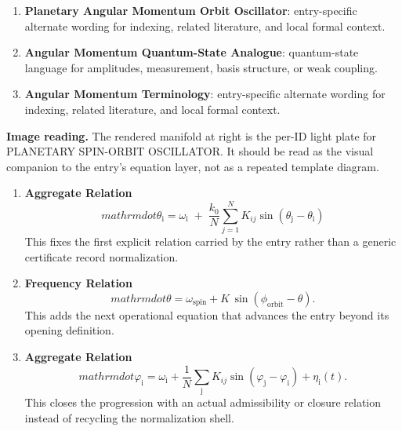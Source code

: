 \begin{enumerate}[leftmargin=1.6em,itemsep=6pt,topsep=4pt]
\item \textbf{Planetary Angular Momentum Orbit Oscillator}: entry-specific alternate wording for indexing, related literature, and local formal context.
\item \textbf{Angular Momentum Quantum-State Analogue}: quantum-state language for amplitudes, measurement, basis structure, or weak coupling.
\item \textbf{Angular Momentum Terminology}: entry-specific alternate wording for indexing, related literature, and local formal context.
\end{enumerate}

\begin{samepage}
\noindent\begin{minipage}[t]{0.45\linewidth}
\vspace{0pt}
\raggedright
\scriptsize\textbf{Image reading.} The rendered manifold at right is the per-ID light plate for PLANETARY SPIN-ORBIT OSCILLATOR. It should be read as the visual companion to the entry's equation layer, not as a repeated template diagram.\par
\end{minipage}\hfill
\begin{minipage}[t]{0.53\linewidth}
\vspace*{-0.10in}
\raggedright
{}
\end{minipage}
\end{samepage}

\clearpage


\begin{enumerate}[leftmargin=1.6em,itemsep=9pt,topsep=6pt]
\item \textbf{Aggregate Relation}
\[
mathrm{dot}\theta_{\mathrm{i}} = \omega_{\mathrm{i}} \;+\; \frac{k_0}{N}\sum_{j=1}^N K_{ij}\sin(\theta_{\mathrm{j}}-\theta_{\mathrm{i}})
\]
This fixes the first explicit relation carried by the entry rather than a generic certificate record normalization.

\item \textbf{Frequency Relation}
\[
mathrm{dot}{\theta} = \omega_{\text{spin}} + K\,\sin(\phi_{\text{orbit}} - \theta).
\]
This adds the next operational equation that advances the entry beyond its opening definition.

\item \textbf{Aggregate Relation}
\[
mathrm{dot}\varphi_{\mathrm{i}} = \omega_{\mathrm{i}} + \frac{1}{N}\sum_{\mathrm{j}} K_{ij}\sin(\varphi_{\mathrm{j}}-\varphi_{\mathrm{i}}) + \eta_{\mathrm{i}}(t).
\]
This closes the progression with an actual admissibility or closure relation instead of recycling the normalization shell.
\end{enumerate}

